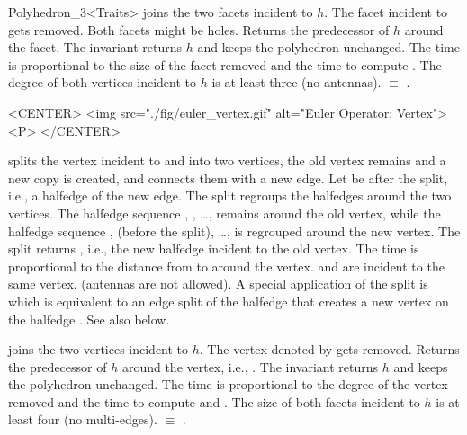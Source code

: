 \begin{ccRefClass}{Polyhedron_3<Traits>}
    {joins the two facets incident to $h$. The facet incident to
       gets removed. Both facets might be
    holes. Returns the predecessor of $h$ around the facet. The invariant
     returns $h$ and keeps
    the polyhedron unchanged. The time is proportional to the size of the
    facet removed and the time to compute .
    \ccPrecond The degree of both vertices incident to $h$ is at least
    three (no antennas).
      $\equiv$ 
    .}

\begin{ccHtmlOnly}
    <CENTER>
    <img src="./fig/euler_vertex.gif" alt="Euler Operator: Vertex"><P>
    </CENTER>
\end{ccHtmlOnly}

    {splits the vertex incident to  and  into two vertices,
    the old vertex remains and a new copy is created,
    and connects them with a new edge. Let  be 
     after the split, i.e., a halfedge
    of the new edge. The split regroups the halfedges around the two 
    vertices. The halfedge sequence , ,
    \ldots,  remains around the old vertex, while the 
    halfedge sequence ,  
    (before the split), \ldots,  is regrouped around the new
    vertex. The split returns , i.e., the new halfedge incident 
    to the old vertex. The time is proportional to the distance from 
     to  around the vertex.
    \ccPrecond {} and  are incident to the same vertex.
                (antennas are not allowed).
     A special application of the split is 
     which is equivalent to an 
    edge split of the halfedge  that creates a new 
    vertex on the halfedge . See also 
    below.}

    {joins the two vertices incident to $h$. The vertex denoted by
       gets removed. Returns the predecessor of
    $h$ around the vertex, i.e., . 
    The invariant  returns
    $h$ and keeps the polyhedron unchanged. 
    The time is proportional to the degree of the vertex removed and 
    the time to compute  and .
    \ccPrecond  The size of both facets incident to $h$ is at least 
    four (no multi-edges).
      $\equiv$ 
    .}


\end{ccRefClass}
